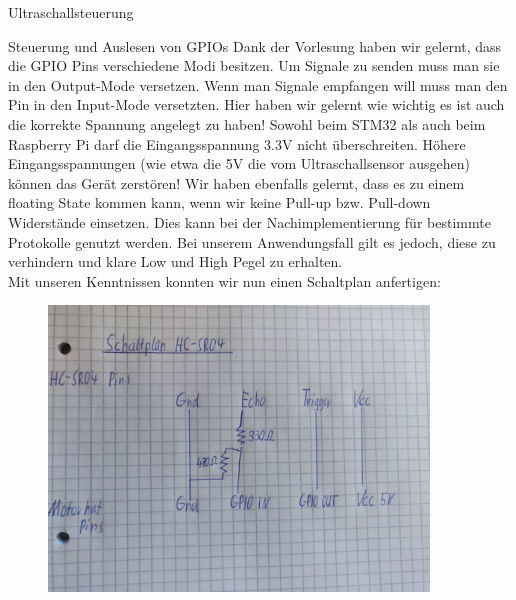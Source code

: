 \documentclass[12pt]{report}
\begin{document}
\begin{section}{Ultraschallsteuerung}
    \begin{subsection}{Steuerung und Auslesen von GPIOs}
        Dank der Vorlesung haben wir gelernt, dass die GPIO Pins verschiedene
        Modi besitzen. Um Signale zu senden muss man sie in den Output-Mode 
        versetzen. Wenn man Signale empfangen will muss man den Pin in
        den Input-Mode versetzten. Hier haben wir gelernt wie wichtig es ist 
        auch die korrekte Spannung angelegt zu haben! Sowohl beim STM32 als auch
        beim Raspberry Pi darf die Eingangsspannung 3.3V nicht überschreiten.
        Höhere Eingangsspannungen (wie etwa die 5V die vom Ultraschallsensor 
        ausgehen) können das Gerät zerstören! Wir haben ebenfalls gelernt, 
        dass es zu einem floating State kommen kann, wenn wir keine Pull-up 
        bzw. Pull-down Widerstände einsetzen. Dies kann bei der 
        Nachimplementierung für bestimmte Protokolle genutzt werden. Bei unserem
        Anwendungsfall gilt es jedoch, diese zu verhindern und klare Low und High
        Pegel zu erhalten.\\
        Mit unseren Kenntnissen konnten wir nun einen Schaltplan anfertigen:
        \begin{figure}[H]
        \centering
            \begin{minipage}{0.49\textwidth}
                \centering
                \includegraphics[width=0.9\textwidth]{lernportfolio_assets/UltraschallsensorSchaltplanAufPapier.jpg}

\end{minipage}
\end{figure}
\end{subsection}
\end{section}
\end{document}
